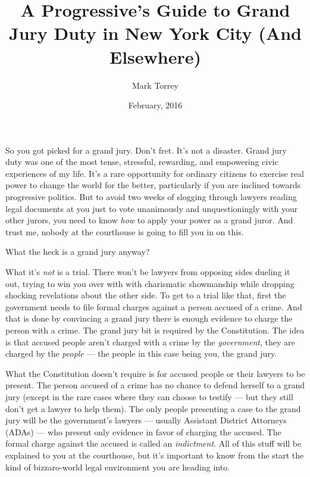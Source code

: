 \documentclass[letterpaper]{article}
\begin{document}
\title{A Progressive's Guide to Grand Jury Duty in New York City (And Elsewhere)}
\author{Mark Torrey}
\date{February, 2016} %
\maketitle




So you got picked for a grand jury.
Don't fret. It's not a disaster.
Grand jury duty was one of the most tense, stressful, rewarding, and empowering civic experiences of my life.
It's a rare opportunity for ordinary citizens to exercise real power to change the world for the better, particularly if you are inclined towards progressive politics.
But to avoid two weeks of slogging through lawyers reading legal documents at you just to vote unanimously and unquestioningly with your other jurors, you need to know \emph{how} to apply your power as a grand juror.
And trust me, nobody at the courthouse is going to fill you in on this.

What the heck is a grand jury anyway? 

What it's \emph{not} is a trial.
There won't be lawyers from opposing sides dueling it out, trying to win you over with with charismatic showmanship while dropping shocking revelations about the other side. 
To get to a trial like that, first the government needs to file formal charges against a person accused of a crime. 
And that is done by convincing a grand jury there is enough evidence to charge the person with a crime. 
The grand jury bit is required by the Constitution.
The idea is that accused people aren't charged with a crime by the \emph{government}, they are charged by the \emph{people} --- the people in this case being you, the grand jury.

What the Constitution doesn't require is for accused people or their lawyers to be present.
The person accused of a crime has no chance to defend herself to a grand jury (except in the rare cases where they can choose to testify --- but they still don't get a lawyer to help them).
The only people presenting a case to the grand jury will be the government's lawyers --- usually Assistant District Attorneys (ADAs) --- who present only evidence in favor of charging the accused.
The formal charge against the accused is called an \emph{indictment}.
All of this stuff will be explained to you at the courthouse, but it's important to know from the start the kind of bizzaro-world legal environment you are heading into.
\end{document}
